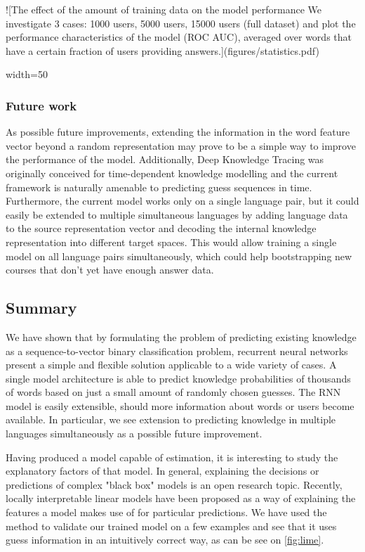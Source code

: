 ![The effect of the amount of training data on the model performance We investigate 3 cases: 1000 users, 5000 users, 15000 users (full dataset) and plot the performance characteristics of the model (ROC AUC), averaged over words that have a certain fraction of users providing answers.\label{fig:statistics}](figures/statistics.pdf){ width=50%

\subsubsection{Future work}

As possible future improvements, extending the information in the word feature vector beyond a random representation may prove to be a simple way to improve the performance of the model. Additionally, Deep Knowledge Tracing was originally conceived for time-dependent knowledge modelling and the current framework is naturally amenable to predicting guess sequences in time. Furthermore, the current model works only on a single language pair, but it could easily be extended to multiple simultaneous languages by adding language data to the source representation vector and decoding the internal knowledge representation into different target spaces. This would allow training a single model on all language pairs simultaneously, which could help bootstrapping new courses that don't yet have enough answer data.

\subsection{Summary}

We have shown that by formulating the problem of predicting existing knowledge as a sequence-to-vector binary classification problem, recurrent neural networks present a simple and flexible solution applicable to a wide variety of cases. A single model architecture is able to predict knowledge probabilities of thousands of words based on just a small amount of randomly chosen guesses. The RNN model is easily extensible, should more information about words or users become available. In particular, we see extension to predicting knowledge in multiple languages simultaneously as a possible future improvement. 

Having produced a model capable of estimation, it is interesting to study the explanatory factors of that model. In general, explaining the decisions or predictions of complex "black box" models is an open research topic. Recently, locally interpretable linear models have been proposed as a way of explaining the features a model makes use of for particular predictions\cite{ribeiro2016should}. We have used the method to validate our trained model on a few examples and see that it uses guess information in an intuitively correct way, as can be see on \cref{fig:lime}.

}
